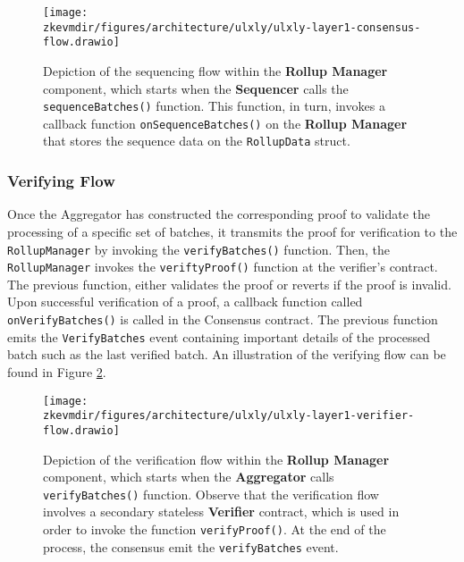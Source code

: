 \vspace{1em}

\begin{figure}[h]
\centering
\texttt{[image: \\zkevmdir/figures/architecture/ulxly/ulxly-layer1-consensus-flow.drawio]}
\caption{Depiction of the sequencing flow within the \textbf{Rollup Manager} component, which starts when the \textbf{Sequencer} calls the \texttt{sequenceBatches()} function. This function, in turn, invokes a callback function \texttt{onSequenceBatches()} on the \textbf{Rollup Manager} that stores the sequence data on the \texttt{RollupData} struct. }
\label{fig:consensus-flow}
\end{figure}


\subsubsection{Verifying Flow}

Once the Aggregator has constructed the corresponding proof to validate the processing of a specific set of batches, it transmits the proof for verification to the \texttt{RollupManager} by invoking the \texttt{verifyBatches()} function. Then, the \texttt{RollupManager} invokes the \texttt{veriftyProof()} function at the verifier's contract. The previous function, either validates the proof or reverts if the proof is invalid. Upon successful verification of a proof, a callback function called \texttt{onVerifyBatches()} is called in the Consensus contract. The previous function emits the \texttt{VerifyBatches} event containing important details of the processed batch such as the last verified batch. An illustration of the verifying flow can be found in Figure \ref{fig:verifier-flow}.

\vspace{1em}

\begin{figure}[h]
\centering
\texttt{[image: \\zkevmdir/figures/architecture/ulxly/ulxly-layer1-verifier-flow.drawio]}
\caption{Depiction of the verification flow within the \textbf{Rollup Manager} component, which starts when the \textbf{Aggregator} calls \texttt{verifyBatches()} function. Observe that the verification flow involves a secondary stateless \textbf{Verifier} contract, which is used in order to invoke the function \texttt{verifyProof()}. At the end of the process, the consensus emit the \texttt{verifyBatches} event. }
\label{fig:verifier-flow}
\end{figure}



